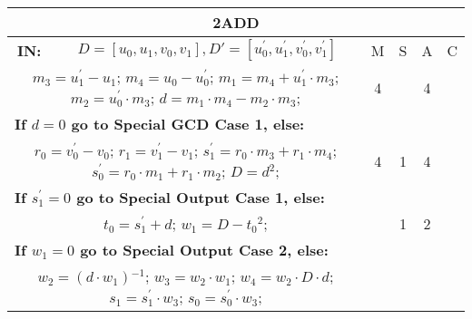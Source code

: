 \begin{tabular}{|c|cr|c|c|c|c|}
\hline
\multicolumn{7}{|c|}{\bf{2ADD}} \TS \\
\hline
\bf{IN:} &\multicolumn{2}{|c|}{$D = [u_0,u_1,v_0,v_1], D' = [u^{\prime}_0,u^{\prime}_1,v^{\prime}_0,v^{\prime}_1]$}
\TS & M & \hspace{1pt}S\hspace{1pt} & A & \hspace{1pt}C\hspace{1pt} \\
\hline
\multicolumn{3}{|R{340pt}|}{ 
$m_3=u^{\prime}_1-u_1$;\hspace{4pt}
$m_4=u_0-u^{\prime}_0$;\hspace{4pt}
$m_1=m_4+u^{\prime}_1 \cdot m_3$;\hspace{4pt}
$m_2=u^{\prime}_0 \cdot m_3$;\hspace{4pt}
$d=m_1 \cdot m_4-m_2 \cdot m_3$;\hspace{4pt}
} & 4 &  & 4 & \\
\multicolumn{3}{|l|}{ 
 \bf{If $d = 0$ go to Special GCD Case 1, else:} } &  &  &  & \\
\multicolumn{3}{|R{340pt}|}{ 
$r_0=v^{\prime}_0-v_0$;\hspace{4pt}
$r_1=v^{\prime}_1-v_1$;\hspace{4pt}
$s^{\prime}_1=r_0 \cdot m_3+r_1 \cdot m_4$;\hspace{4pt}
$s^{\prime}_0=r_0 \cdot m_1+r_1 \cdot m_2$;\hspace{4pt}
$D=d{}^{2}$;\hspace{4pt}
} & 4 & 1 & 4 & \\
\multicolumn{3}{|l|}{ 
 \bf{If $s^{\prime}_1 = 0$ go to Special Output Case 1, else:} } &  &  &  & \\
\multicolumn{3}{|R{340pt}|}{ 
$t_0=s^{\prime}_1+d$;\hspace{4pt}
$w_1=D-t_0{}^{2}$;\hspace{4pt}
} &  & 1 & 2 & \\
\multicolumn{3}{|l|}{ 
 \bf{If $w_1 = 0$ go to Special Output Case 2, else:} } &  &  &  & \\
\multicolumn{3}{|R{340pt}|}{ 
$w_2=(d \cdot w_1){}^{-1}$;\hspace{4pt}
$w_3=w_2 \cdot w_1$;\hspace{4pt}
$w_4=w_2 \cdot D \cdot d$;\hspace{4pt}
$s_1=s^{\prime}_1 \cdot w_3$;\hspace{4pt}
$s_0=s^{\prime}_0 \cdot w_3$;\hspace{4pt}
}
\end{tabular}
